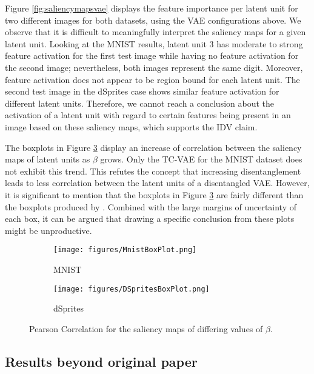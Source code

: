 Figure \ref{fig:saliencymapsvae} displays the feature importance per latent unit for two different images for both datasets, using the VAE configurations above. We observe that it is difficult to meaningfully interpret the saliency maps for a given latent unit. Looking at the MNIST results, latent unit 3 has moderate to strong feature activation for the first test image while having no feature activation for the second image; nevertheless, both images represent the same digit. Moreover, feature activation does not appear to be region bound for each latent unit. The second test image in the dSprites case shows similar feature activation for different latent units. Therefore, we cannot reach a conclusion about the activation of a latent unit with regard to certain features being present in an image based on these saliency maps, which supports the IDV claim.

The boxplots in Figure \ref{fig:boxplotsvae} display an increase of correlation between the saliency maps of latent units as $\beta$ grows. Only the TC-VAE for the MNIST dataset does not exhibit this trend. This refutes the concept that increasing disentanglement leads to less correlation between the latent units of a disentangled VAE. However, it is significant to mention that the boxplots in Figure \ref{fig:boxplotsvae} are fairly different than the boxplots produced by \citeauthor{LabelFreeExplainability}. Combined with the large margins of uncertainty of each box, it can be argued that drawing a specific conclusion from these plots might be unproductive.

\begin{figure}[H]
\centering
\begin{subfigure}{0.49\textwidth}
    \texttt{[image: figures/MnistBoxPlot.png]}
    \caption{MNIST}
    \label{fig:mnistboxplot}
\end{subfigure}
\hfill
\begin{subfigure}{0.49\textwidth}
    \texttt{[image: figures/DSpritesBoxPlot.png]}
    \caption{dSprites}
    \label{fig:dspritesboxplot}
\end{subfigure}
\caption{Pearson Correlation for the saliency maps of differing values of $\beta$.}
\label{fig:boxplotsvae}
\end{figure}

\subsection{Results beyond original paper}
\label{section:extension_results}

